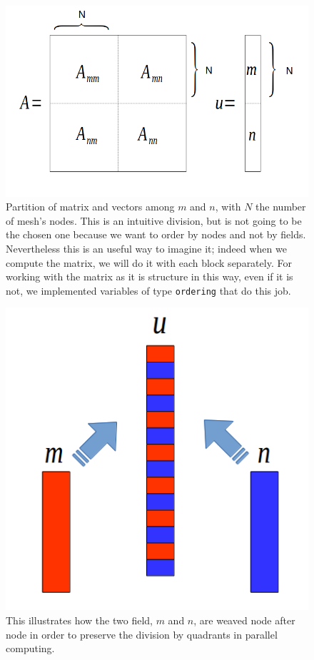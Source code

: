 \begin{figure}[h]
	\centering
	\includegraphics[width=0.7\linewidth]{A_m_n}
	\caption[Partition of matrix and vectors among $ m $ and $ n $]{Partition of matrix and vectors among $ m $ and $ n $, with $ N $ the number of mesh's nodes. This is an intuitive division, but is not going to be the chosen one because we want to order by nodes and not by fields. Nevertheless this is an useful way to imagine it; indeed when we compute the matrix, we will do it with each block separately. For working with the matrix as it is structure in this way, even if it is not, we implemented variables of type \texttt{ordering} that do this job. }
	\label{A_m_n}
\end{figure}
\begin{figure}[h]
	\centering
	\includegraphics[width=0.7\linewidth]{weave}
	\caption[Chain of different fields]{This illustrates how the two field, $ m $ and $ n $, are weaved node after node in order to preserve the division by quadrants in parallel computing.}
	\label{weave}
\end{figure}
 